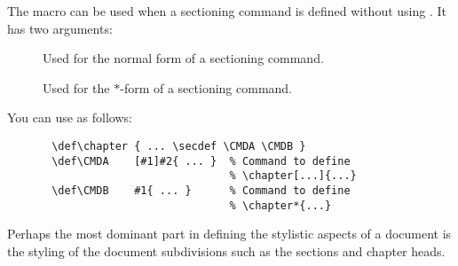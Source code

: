 \DescribeMacro{\secdef}
    The macro  can be used when a sectioning command is
    defined without using . It has two arguments:


    \begin{description}
    \item[] Used for the normal form of a
          sectioning command.
    \item[] Used for the $*$-form of a
          sectioning command.
    \end{description}

    You can use  as follows:
 \begin{verbatim}
       \def\chapter { ... \secdef \CMDA \CMDB }
       \def\CMDA    [#1]#2{ ... }  % Command to define
                                   % \chapter[...]{...}
       \def\CMDB    #1{ ... }      % Command to define
                                   % \chapter*{...}
 \end{verbatim}


Perhaps the most dominant part in defining the stylistic aspects of a document is the styling of the document subdivisions such as the sections and chapter heads.



